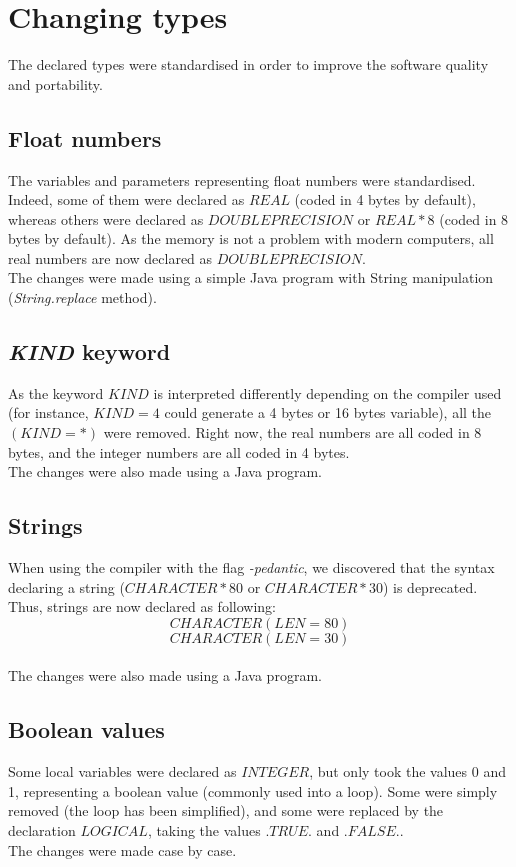 \section{Changing types}
The declared types were standardised in order to improve the software quality and portability.

\subsection{Float numbers}
The variables and parameters representing float numbers were standardised. Indeed, some of them were declared as $REAL$ (coded in 4 bytes by default), whereas others were declared as $DOUBLE PRECISION$ or $REAL*8$ (coded in 8 bytes by default). As the memory is not a problem with modern computers, all real numbers are now declared as $DOUBLE PRECISION$.
\\The changes were made using a simple Java program with String manipulation (\textit{String.replace} method).

\subsection{\textit{KIND} keyword}
As the keyword $KIND$ is interpreted differently depending on the compiler used (for instance, $KIND=4$ could generate a 4 bytes or 16 bytes variable), all the $(KIND=*)$ were removed.
Right now, the real numbers are all coded in 8 bytes, and the integer numbers are all coded in 4 bytes.
\\The changes were also made using a Java program.

\subsection{Strings}
When using the compiler with the flag \textit{-pedantic}, we discovered that the syntax declaring a string ($CHARACTER*80$ or $CHARACTER*30$) is deprecated. Thus, strings are now declared as following: 
\[CHARACTER (LEN=80)\]
\[CHARACTER (LEN=30)\]
\\The changes were also made using a Java program.

\subsection{Boolean values}
Some local variables were declared as $INTEGER$, but only took the values 0 and 1, representing a boolean value (commonly used into a loop). Some were simply removed (the loop has been simplified), and some were replaced by the declaration $LOGICAL$, taking the values $.TRUE.$ and $.FALSE.$.
\\The changes were made case by case.


